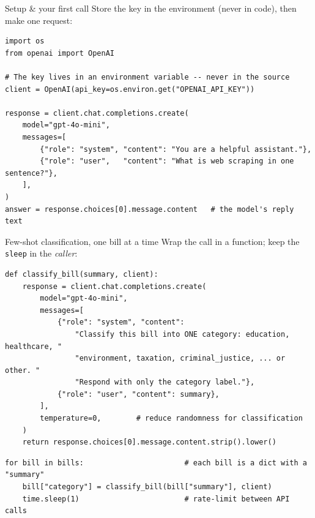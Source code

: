 \documentclass[9pt,aspectratio=169]{beamer}
\begin{document}
\begin{frame}[fragile]{Setup \& your first call}
    Store the key in the environment (never in code), then make one request:
\begin{lstlisting}
import os
from openai import OpenAI

# The key lives in an environment variable -- never in the source
client = OpenAI(api_key=os.environ.get("OPENAI_API_KEY"))

response = client.chat.completions.create(
    model="gpt-4o-mini",
    messages=[
        {"role": "system", "content": "You are a helpful assistant."},
        {"role": "user",   "content": "What is web scraping in one sentence?"},
    ],
)
answer = response.choices[0].message.content   # the model's reply text
\end{lstlisting}
\end{frame}

\begin{frame}[fragile]{Few-shot classification, one bill at a time}
    Wrap the call in a function; keep the \texttt{sleep} in the \textit{caller}:
\begin{lstlisting}
def classify_bill(summary, client):
    response = client.chat.completions.create(
        model="gpt-4o-mini",
        messages=[
            {"role": "system", "content":
                "Classify this bill into ONE category: education, healthcare, "
                "environment, taxation, criminal_justice, ... or other. "
                "Respond with only the category label."},
            {"role": "user", "content": summary},
        ],
        temperature=0,        # reduce randomness for classification
    )
    return response.choices[0].message.content.strip().lower()
\end{lstlisting}
\begin{lstlisting}
for bill in bills:                       # each bill is a dict with a "summary"
    bill["category"] = classify_bill(bill["summary"], client)
    time.sleep(1)                        # rate-limit between API calls
\end{lstlisting}
\end{frame}
\end{document}
